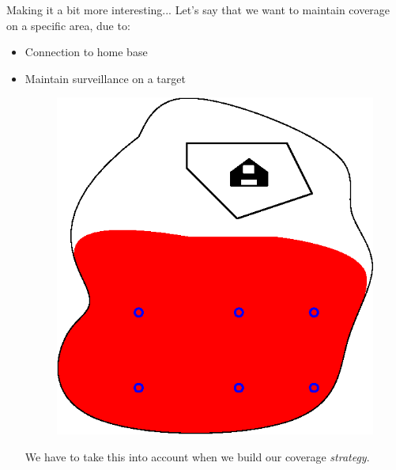 \documentclass[t]{beamer}
\begin{document}
\begin{frame}[label=motivation9]{Making it a bit more interesting...}
Let's say that we want to maintain coverage on a specific area, due to:
\begin{itemize}
\item Connection to home base
\item Maintain surveillance on a target
\begin{figure}[b]
\includegraphics[scale=0.4]{motivation/deployment-configuration-coverage-constraint.eps}
\end{figure}
We have to take this into account when we build our coverage \emph{strategy}.
\end{itemize}
\end{frame}
\end{document}
